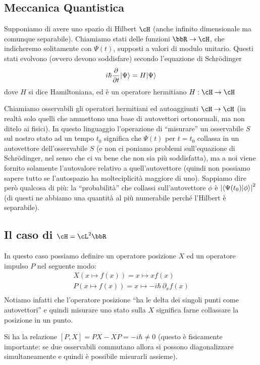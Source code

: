 \documentclass[10pt,a4paper]{article}
\begin{document}
\begin{multicols}{2}
  \section*{Meccanica Quantistica}
  Supponiamo di avere uno spazio di Hilbert $\cH$ (anche infinito dimensionale ma comunque separabile). Chiamiamo stati delle funzioni $\bbR \rar \cH$, che indicheremo solitamente con $\Psi(t)$, supposti a valori di modulo unitario. Questi stati evolvono (ovvero devono soddisfare) secondo l'equazione di Schrödinger
  $$ i \hbar \frac{\partial {}}{\partial {t}} |\Psi\rangle = H |\Psi\rangle $$
  dove $H$ si dice Hamiltoniana, ed è un operatore hermitiano $H: \cH \rar \cH$
  
  Chiamiamo osservabili gli operatori hermitiani ed autoaggiunti $\cH \rar \cH$ (in realtà solo quelli che ammettono una base di autovettori ortonormali, ma non ditelo ai fisici). In questo linguaggio l'operazione di ``misurare'' un osservabile $S$ sul nostro stato ad un tempo $t_0$ significa che $\Psi(t)$ per $t = t_0$ collassa in un autovettore dell'osservabile $S$ (e non ci poniamo problemi sull'equazione di Schrödinger, nel senso che ci va bene che non sia più soddisfatta), ma a noi viene fornito solamente l'autovalore relativo a quell'autovettore (quindi non possiamo sapere tutto se l'autospazio ha molteciplicità maggiore di uno). Sappiamo dire però qualcosa di più: la ``probabilità'' che collassi sull'autovettore $\phi$ è $\left|{\langle \Psi(t_0) | \phi \rangle}\right|^2$ (di questi ne abbiamo una quantità al più numerabile perché l'Hilbert è separabile).

  \subsection*{Il caso di $\cH = \cL^2 \bbR$}
  In questo caso possiamo definire un operatore posizione $X$ ed un operatore impulso $P$ nel seguente modo:
  \begin{displaymath}
    \begin{array}{c}
      X(x \mapsto f(x)) = x \mapsto x f(x) \\
      P(x \mapsto f(x)) = x \mapsto -i \hbar \, \partial_x f(x) \\
    \end{array}
  \end{displaymath}
  Notiamo infatti che l'operatore posizione ``ha le delta dei singoli punti come autovettori'' e quindi misurare uno stato sulla $X$ significa farne collassare la posizione in un punto.

  Si ha la relazione $[P, X] = PX - XP = - i \hbar \neq 0$ (questo è fisicamente importante: se due osservabili commutano allora si possono diagonalizzare simultaneamente e quindi è possibile misurarli assieme).


\end{multicols}
\end{document}
